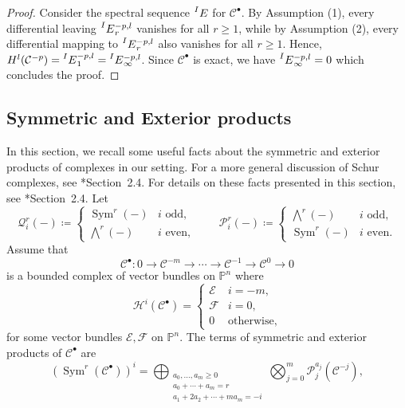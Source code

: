 \documentclass[11pt,letterpaper,reqno]{amsart}
\newcommand{\Sym}{\operatorname{Sym}}
\newcommand{\mc}[1]{\mathcal{#1}}
\def\PP{{\mathbb P}}
\def\lra{\longrightarrow}
\theoremstyle{definition}
\numberwithin{equation}{section}
\begin{document}
\begin{proof}
    Consider the spectral sequence $\prescript{I}{}{E}$ for $\mc{C}^\bullet$. By Assumption (1), every differential leaving $\prescript{I}{}{E}_r^{-p,l}$ vanishes for all $r \ge 1$, while by Assumption (2), every differential mapping to $\prescript{I}{}{E}_r^{-p,l}$ also vanishes for all $r \ge 1$. Hence, $H^l(\mc{C}^{-p}) = \prescript{I}{}{E}_1^{-p,l} = \prescript{I}{}{E}_\infty^{-p,l}$. Since $\mc{C}^\bullet$ is exact, we have $\prescript{I}{}{E}_\infty^{-p,l} = 0$ which concludes the proof.
\end{proof}


\subsection{Symmetric and Exterior products}\label{sec:prelim-symext}
In this section, we recall some useful facts about the symmetric and exterior products of complexes in our setting. For a more general discussion of Schur complexes, see \cite{weyman}*{Section~2.4}. For details on these facts presented in this section, see \cite{yang}*{Section~2.4}. Let 
\[\mc{Q}_i^r(-) \coloneqq \begin{cases}
    \Sym^r(-) &i \text{ odd},\\
    \bigwedge^r(-) &i \text{ even},
\end{cases} \qquad \mc{P}_i^r(-) \coloneqq \begin{cases}
    \bigwedge^r(-) &i \text{ odd},\\
    \Sym^r(-) &i \text{ even}.
\end{cases}\]
Assume that
\[\mc{C}^\bullet \colon 0 \lra \mc{C}^{-m} \lra \cdots \lra \mc{C}^{-1} \lra \mc{C}^0 \lra 0\]
is a bounded complex of vector bundles on $\PP^n$ where
\[\mc{H}^i(\mc{C}^\bullet) = \begin{cases}
    \mc{E} & i = -m,\\
    \mc{F} & i = 0,\\
    0 & \text{otherwise,}
\end{cases}\]
for some vector bundles $\mc{E},\mc{F}$ on $\PP^n$. The terms of symmetric and exterior products of $\mc{C}^\bullet$ are
\begin{equation}\label{eq:termsSym}
    \left(\Sym^r(\mc{C}^\bullet)\right)^{i} = \bigoplus_{\substack{a_0,\dots,a_m \ge 0\\ a_0 + \cdots + a_m = r\\ a_1 + 2a_2 + \cdots + ma_m = -i}} \bigotimes_{j = 0}^m \mc{P}^{a_j}_{j} (\mc{C}^{-j}),
\end{equation}
\end{document}
